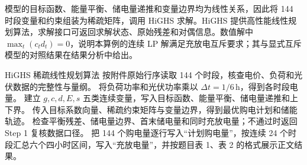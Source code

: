 模型的目标函数、能量平衡、储电量递推和变量边界均为线性关系，因此将 144 时段变量和约束组装为稀疏矩阵，调用 HiGHS 求解。HiGHS 提供高性能线性规划算法\cite{highs}，求解接口可返回求解状态、原始残差和对偶信息。数值解中 $\max_t(c_td_t)=0$，说明本算例的连续 LP 解满足充放电互斥要求；其与显式互斥模型的对照结果在结果分析中给出。

\noindent HiGHS 稀疏线性规划算法
\algorithmstart
{}
按附件原始行序读取 144 个时段，核查电价、负荷和光伏数据的完整性与量纲。
将负荷功率和光伏功率乘以 $\Delta t=1/6\,\mathrm{h}$，得到各时段电量。
建立 $g,c,d,E,s$ 五类连续变量，写入目标函数、能量平衡、储电量递推和上下界。
传入目标系数向量、稀疏约束矩阵与变量边界，得到最优购电计划和储能轨迹。
检查平衡残差、储电量边界、首末储电量和同时充放电量；不通过时返回 Step 1 复核数据口径。
把 144 个购电量逐行写入“计划购电量”，按连续 24 个时段汇总六个四小时区间，写入“充放电量”，并按题目表 1、表 2 的格式展示正文结果。
\algorithmend
